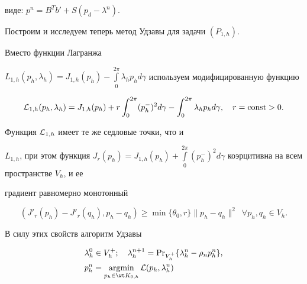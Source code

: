 виде: $ p^{n}=B^Tb'+S(p_d-\lambda^n). $





Построим и исследуем теперь метод Удзавы для задачи $(P_{1,h})$.


Вместо функции Лагранжа


$L_{1,h}(p_h,\lambda_h)=J_{1,h}(p_h)-\int\limits_{0}^{2\pi} \lambda_h p_h


d\gamma$ используем модифицированную функцию


$$




{\cal L}_{1,h}(p_h,\lambda_h)=J_{1,h}(p_h)+r\int_{0}^{2\pi}


(p_h^{-})^2 d\gamma-\int_{0}^{2\pi} \lambda_h p_h d\gamma,\quad


r=\const>0.




$$


Функция ${\cal L}_{1,h}$ имеет те же седловые точки, что и


$L_{1,h}$, при этом функция $J_r(p_h)=J_{1,h}(p_h)+\int\limits_{0}^{2\pi}


(p_h^{-})^2 d\gamma$ коэрцитивна на всем пространстве $V_h$, и ее


градиент равномерно монотонный


$$


(J'_r(p_h)-J'_r(q_h),


p_h-q_h)\geq \min\{\theta_0, r\}\|p_h-q_h\|^2 \ \;\forall p_h, q_h


\in V_h.


$$


В силу этих свойств алгоритм Удзавы


\begin{equation}\label{mod}


\begin{split}


&\lambda_h^{0} \in V_h^{+};


\quad \lambda_h^{n+1}= \PR_{V_h^{+}}


\{\lambda_h^{n}-\rho_{n}p_h^{n}\},\\


&p_h^{n}= \argmin\limits_{p_h\in \wt K_{0,h}} {\cal L}(p_h,\lambda_h^{n})


\end{split}


\end{equation}


